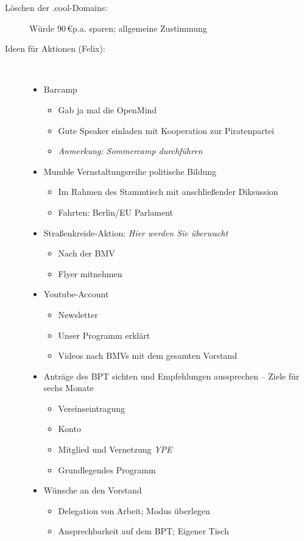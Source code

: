 \begin{Protokoll}
	\begin{description}
		\item[Löschen der .cool-Domains: ] Würde 90\,\euro p.a. sparen; allgemeine Zustimmung
		\item[Ideen für Aktionen (Felix):] \
		\begin{itemize}
			\item Barcamp
			      \begin{itemize}
			      	\item Gab ja mal die OpenMind
					\item Gute Speaker einladen mit Kooperation zur Piratenpartei	
					\item \emph{Anmerkung: Sommercamp durchführen}  
			      \end{itemize}
			\item Mumble Vernstaltungsreihe politische Bildung
			      \begin{itemize}
			      	\item Im Rahmen des Stammtisch mit anschließender Diksussion
			      	\item Fahrten: Berlin/EU Parlament		
			      \end{itemize}
			\item Straßenkreide-Aktion: \emph{Hier werden Sie überwacht}
			      \begin{itemize}
			      	\item Nach der BMV
			      	\item Flyer mitnehmen		
			      \end{itemize}
			\item Youtube-Account
			      \begin{itemize}
			      	\item Newsletter
			      	\item Unser Programm erklärt
			      	\item Videos nach BMVs mit dem gesamten Vorstand 		
			      \end{itemize}
			\item Anträge des BPT sichten und Empfehlungen aussprechen -- Ziele für sechs Monate
			      \begin{itemize}
			      	\item Vereinseintragung
			      	\item Konto
			      	\item Mitglied und Vernetzung \emph{YPE}
			      	\item Grundlegendes Programm				
			      \end{itemize}
			\item Wünsche an den Vorstand
			      \begin{itemize}
			      	\item Delegation von Arbeit; Modus überlegen
			      	\item Ansprechbarkeit auf dem BPT; Eigener Tisch			
				  \end{itemize}
		\end{itemize}
		
	\end{description}
			
		
\end{Protokoll}


